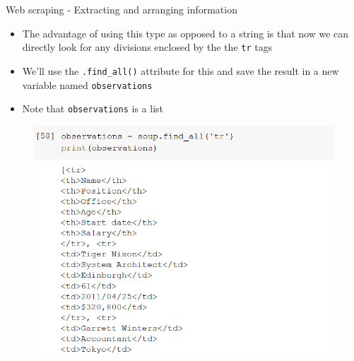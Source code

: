 \documentclass[aspectratio=169]{beamer}
\begin{document}
\begin{frame}{Web scraping - Extracting and arranging information}

	\begin{multicols}{2}

		\begin{itemize}
			\item The advantage of using this type as opposed to a string is that now we can directly look for any divisions enclosed by the the \texttt{tr} tags
			\item We'll use the \texttt{.find\_all()} attribute for this and save the result in a new variable named \texttt{observations}
			\item Note that \texttt{observations} is a list
		\end{itemize}

		\begin{figure}
			\centering
			\includegraphics[width=\linewidth]{img/tr_list.png}
		\end{figure}
	
	\end{multicols}

\end{frame}
\end{document}
